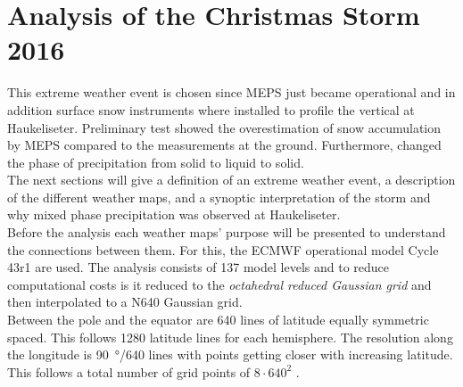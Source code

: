 \chapter{Analysis of the Christmas Storm 2016}
This extreme weather event is chosen since MEPS just became operational and in addition surface snow instruments where installed to profile the vertical at Haukeliseter. Preliminary test showed the overestimation of snow accumulation by MEPS compared to the measurements at the ground. Furthermore, changed the phase of precipitation from solid to liquid to solid.  
\\
The next sections will give a definition of an extreme weather event, a description of the different weather maps, and a synoptic interpretation of the storm and why mixed phase precipitation was observed at Haukeliseter. \\
Before the analysis each weather maps' purpose  will be presented to understand the connections between them. For this, the ECMWF operational model Cycle {43r1} are used. The analysis consists of 137 model levels and to reduce computational costs is it reduced to the \textit{octahedral reduced Gaussian grid} and then interpolated to a N640 Gaussian grid. 
\\
Between the pole and the equator are 640 lines of latitude equally symmetric spaced. This follows 1280 latitude lines for each hemisphere. The resolution along the longitude is \SI{90}{\degree}/640 lines with points getting closer with increasing latitude. This follows a total number of grid points of $8 \cdot 640^2$ \citep{dando_introducing_2016}.



\newpage




